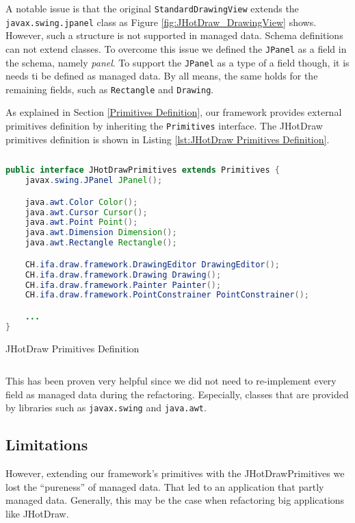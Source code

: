 A notable issue is that the original \texttt{StandardDrawingView} extends the \texttt{javax.swing.jpanel} class as Figure \ref{fig:JHotDraw_DrawingView} shows.
However, such a structure is not supported in managed data. 
Schema definitions can not extend classes.
To overcome this issue we defined the \texttt{JPanel} as a field in the schema, namely \textit{panel}.
To support the \texttt{JPanel} as a type of a field though, it is needs ti be defined as managed data.
By all means, the same holds for the remaining fields, such as \texttt{Rectangle} and \texttt{Drawing}.

As explained in Section \ref{Primitives Definition}, our framework provides external primitives definition by inheriting the \texttt{Primitives} interface.
The JHotDraw primitives definition is shown in Listing \ref{lst:JHotDraw Primitives Definition}.

\begin{sourcecode}[H]
	\begin{lstlisting}[language=Java, escapechar=|]
public interface JHotDrawPrimitives extends Primitives {
	javax.swing.JPanel JPanel();

	java.awt.Color Color();
	java.awt.Cursor Cursor();
	java.awt.Point Point();
	java.awt.Dimension Dimension();
	java.awt.Rectangle Rectangle();

	CH.ifa.draw.framework.DrawingEditor DrawingEditor();
	CH.ifa.draw.framework.Drawing Drawing();
	CH.ifa.draw.framework.Painter Painter();
	CH.ifa.draw.framework.PointConstrainer PointConstrainer();

	...
}
	\end{lstlisting}
	\caption{JHotDraw Primitives Definition}
	\label{lst:JHotDraw Primitives Definition}
\end{sourcecode}

This has been proven very helpful since we did not need to re-implement every field as managed data during the refactoring. 
Especially, classes that are provided by libraries such as \texttt{javax.swing} and \texttt{java.awt}.

\subsection{Limitations}
However, extending our framework's primitives with the JHotDrawPrimitives we lost the ``pureness'' of managed data.
That led to an application that partly managed data.
Generally, this may be the case when refactoring big applications like JHotDraw.

